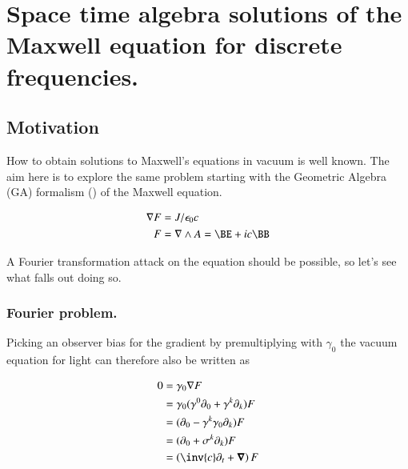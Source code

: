 %

\chapter{Space time algebra solutions of the Maxwell equation for discrete frequencies.}
\label{chap:maxwellVacuum}
\date{July 2, 2009 $RCSfile: maxwellVacuum.tex,v $ Last $Revision: 1.8 $ $Date: 2009/08/06 09:35:17 $}

\beginArtWithToc

\section{Motivation}

How to obtain solutions to Maxwell's equations in vacuum is well known.  The aim here is to explore the same problem starting with the Geometric Algebra (GA) formalism (\citep{doran2003gap}) of the Maxwell equation.

\begin{align}\label{eqn:maxwellVacuum:maxwell}
\grad F &= J/\epsilon_0 c \\
F &= \grad \wedge A = \BE + i c \BB
\end{align}

A Fourier transformation attack on the equation should be possible, so let's see what falls out doing so.

\subsection{Fourier problem.}

Picking an observer bias for the gradient by premultiplying with $\gamma_0$ the vacuum equation for light can therefore also be written as

\begin{align*}
0
&= \gamma_0 \grad F \\
&= \gamma_0 (\gamma^0 \partial_0 + \gamma^k \partial_k) F \\
&= (\partial_0 - \gamma^k \gamma_0 \partial_k) F \\
&= (\partial_0 + \sigma^k \partial_k) F \\
&= \left(\inv{c}\partial_t + \spacegrad \right) F \\
\end{align*}

